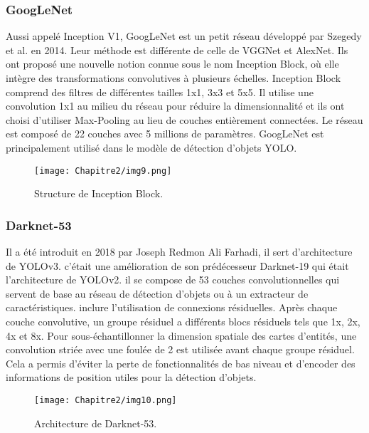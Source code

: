           \subsubsection{GoogLeNet} \cite{googlenet_paper}
          Aussi appelé Inception V1, GoogLeNet est un petit réseau développé par Szegedy et al. en 2014. Leur méthode est différente de celle de VGGNet et AlexNet. Ils ont proposé une nouvelle notion connue sous le nom Inception Block, où elle intègre des transformations convolutives à plusieurs échelles. Inception Block comprend des filtres de différentes tailles 1x1, 3x3 et 5x5. Il utilise une convolution 1x1 au milieu du réseau pour réduire la dimensionnalité et ils ont choisi d'utiliser Max-Pooling au lieu de couches entièrement connectées. Le réseau est composé de 22 couches avec 5 millions de paramètres. GoogLeNet est principalement utilisé dans le modèle de détection d'objets YOLO.
          \begin{figure}[H]
               \centering
               \texttt{[image: Chapitre2/img9.png]}
               \caption{Structure de Inception Block.}
               \label{img9}
               \end{figure}

           \subsubsection{Darknet-53} \cite{darknet_paper}
           Il a été introduit en 2018 par Joseph Redmon Ali Farhadi, il sert d'architecture de YOLOv3. c'était une amélioration de son prédécesseur Darknet-19 qui était l'architecture de YOLOv2. il se compose de 53 couches convolutionnelles qui servent de base au réseau de détection d'objets ou à un extracteur de caractéristiques. inclure l'utilisation de connexions résiduelles. Après chaque couche convolutive, un groupe résiduel a différents blocs résiduels tels que 1x, 2x, 4x et 8x. Pour sous-échantillonner la dimension spatiale des cartes d'entités, une convolution striée avec une foulée de 2 est utilisée avant chaque groupe résiduel. Cela a permis d'éviter la perte de fonctionnalités de bas niveau et d'encoder des informations de position utiles pour la détection d'objets.
           \begin{figure}[H]
                \centering
                \texttt{[image: Chapitre2/img10.png]}
                \caption{Architecture de Darknet-53.}
                \label{img10}
                \end{figure}


